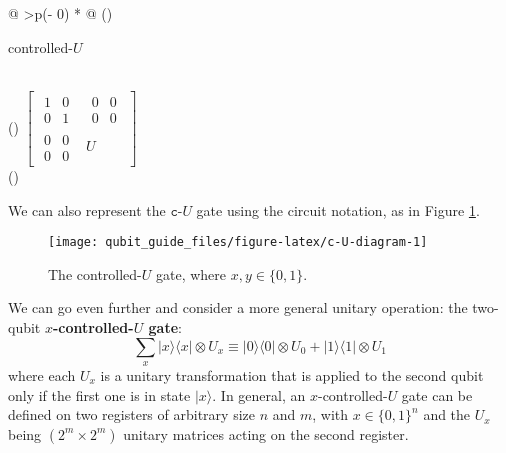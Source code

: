 \documentclass[fleqn]{article}
\newenvironment{idea}{\noindent}{\medskip}
\begin{document}
\begin{idea}

\begin{longtable}[]{@{}
  >{\centering\arraybackslash}p{(\columnwidth - 0\tabcolsep) * }@{}}
\toprule()
\begin{minipage}[b]{\linewidth}\centering
controlled-\(U\)
\end{minipage} \\
\midrule()
\endhead
\(\left[\begin{array}{c|c}\begin{matrix}1&0\\0&1\end{matrix}&\begin{matrix}0&0\\0&0\end{matrix}\\\hline\begin{matrix}0&0\\0&0\end{matrix}&U\end{array}\right]\) \\
\bottomrule()
\end{longtable}

\end{idea}

We can also represent the \(\texttt{c-}U\) gate using the circuit notation, as in Figure \ref{fig:c-U-diagram}.



\begin{figure}[H]

{\centering \texttt{[image: qubit\_guide\_files/figure-latex/c-U-diagram-1]} 

}

\caption{The controlled-\(U\) gate, where \(x,y\in\{0,1\}\).}\label{fig:c-U-diagram}
\end{figure}

We can go even further and consider a more general unitary operation: the two-qubit \textbf{\(x\)-controlled-\(U\) gate}:
\[
  \sum_x |x\rangle\langle x|\otimes U_x
  \equiv
  |0\rangle\langle 0|\otimes U_0 + |1\rangle\langle 1|\otimes U_1
\]
where each \(U_x\) is a unitary transformation that is applied to the second qubit only if the first one is in state \(|x\rangle\).
In general, an \(x\)-controlled-\(U\) gate can be defined on two registers of arbitrary size \(n\) and \(m\), with \(x\in\{0,1\}^n\) and the \(U_x\) being \((2^m\times 2^m)\) unitary matrices acting on the second register.
\end{document}
